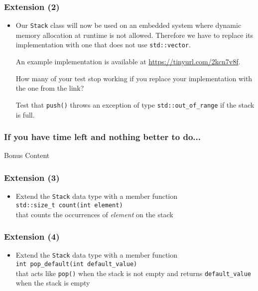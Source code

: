 \documentclass[10pt,aspectratio=169]{beamer}
\begin{document}
\begin{frame}[fragile]
  \frametitle{Extension (2)}
  \begin{itemize}
    \item Our \texttt{Stack} class will now be used on an embedded system where
          dynamic memory allocation at runtime is not allowed. Therefore we have
          to replace its implementation with one that does not use
          \verb!std::vector!.

          An example implementation is available at \url{https://tinyurl.com/2kcn7v8f}.

          How many of your test stop working if you replace your implementation
          with the one from the link?

          Test that \texttt{push()} throws an exception of type
          \verb!std::out_of_range! if the stack is full.
  \end{itemize}
\end{frame}

\begin{frame}[fragile]
  \frametitle{If you have time left and nothing better to do...}
  \begin{center}
    \LARGE Bonus Content
  \end{center}
\end{frame}

\begin{frame}[fragile]
  \frametitle{Extension (3)}
  \begin{itemize}
    \item Extend the \texttt{Stack} data type with a member function\\[1ex]
          \verb!std::size_t count(int element)!\\[1ex]
          that counts the occurrences of \emph{element} on the stack
  \end{itemize}
\end{frame}

\begin{frame}[fragile]
  \frametitle{Extension (4)}
  \begin{itemize}
    \item Extend the \texttt{Stack} data type with a member function\\[1ex]
          \verb!int pop_default(int default_value)!\\[1ex]
          that acts like \texttt{pop()} when the stack is not empty and
          returns \verb!default_value! when the stack is empty
  \end{itemize}
\end{frame}
\end{document}
